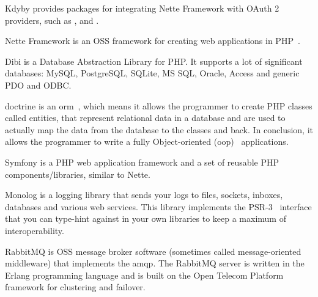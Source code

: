 Kdyby provides packages for integrating Nette Framework with OAuth 2 providers, such as ,  and .

 \label{sec:theory:nette}

Nette Framework is an OSS framework for creating web applications in PHP~\cite{wiki:nette}.

 \label{sec:theory:dibi}

Dibi is a Database Abstraction Library for PHP. It supports a lot of significant databases: MySQL, PostgreSQL, SQLite, MS SQL, Oracle, Access and generic PDO and ODBC.~\cite{dibi:homepage}

 \label{sec:theory:doctrine}

\gls{doctrine} is an \gls{orm}~\cite{wiki:orm}, which means it allows the programmer to create PHP classes called entities, that represent relational data in a database and are used to actually map the data from the database to the classes and back. In conclusion, it allows the programmer to write a fully Object-oriented (\acrshort{oop})~\cite{wiki:oop} applications.

 \label{sec:theory:symfony}

Symfony is a PHP web application framework and a set of reusable PHP components/libraries, similar to Nette.~\cite{wiki:symfony}

 \label{sec:theory:monolog}

Monolog is a logging library that sends your logs to files, sockets, inboxes, databases and various web services. This library implements the PSR-3~\cite{fig:psr} interface that you can type-hint against in your own libraries to keep a maximum of interoperability.~\cite{monolog:readme}

 \label{sec:theory:rabbitmq}

RabbitMQ is OSS message broker software (sometimes called message-oriented middleware) that implements the \gls{amqp}. The RabbitMQ server is written in the Erlang programming language and is built on the Open Telecom Platform framework for clustering and failover.~\cite{wiki:rabbitmq}

 \label{sec:theory:elasticsearch}

